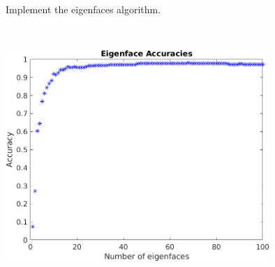 Implement the eigenfaces algorithm.

\begin{solution} \
    \ \\
    \begin{center}
        \includegraphics[width=0.75\textwidth]{img/e5p1.png}
    \end{center}
\end{solution}